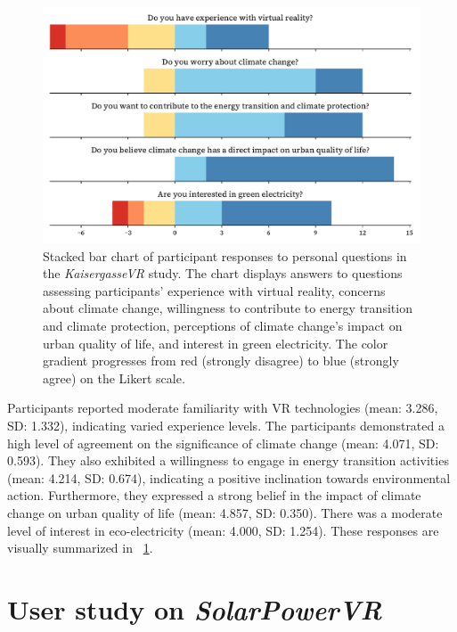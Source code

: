 \documentclass[draft, final]{vutinfth} %
\begin{document}
\begin{figure}[h]
    \centering
    \includegraphics[width=\textwidth]{graphics/participants-kaisergasse.pdf}
    \caption{Stacked bar chart of participant responses to personal questions in the \textit{KaisergasseVR} study. The chart displays answers to questions assessing participants' experience with virtual reality, concerns about climate change, willingness to contribute to energy transition and climate protection, perceptions of climate change's impact on urban quality of life, and interest in green electricity. The color gradient progresses from red (strongly disagree) to blue (strongly agree) on the Likert scale.}
    \label{fig:participants_kaisergasse}
\end{figure}

Participants reported moderate familiarity with VR technologies (mean: 3.286, SD: 1.332), indicating varied experience levels. The participants demonstrated a high level of agreement on the significance of climate change (mean: 4.071, SD: 0.593). They also exhibited a willingness to engage in energy transition activities (mean: 4.214, SD: 0.674), indicating a positive inclination towards environmental action. Furthermore, they expressed a strong belief in the impact of climate change on urban quality of life (mean: 4.857, SD: 0.350). There was a moderate level of interest in eco-electricity (mean: 4.000, SD: 1.254). These responses are visually summarized in \figurename~\ref{fig:participants_kaisergasse}.

\section{User study on \textit{SolarPowerVR}}
\end{document}
